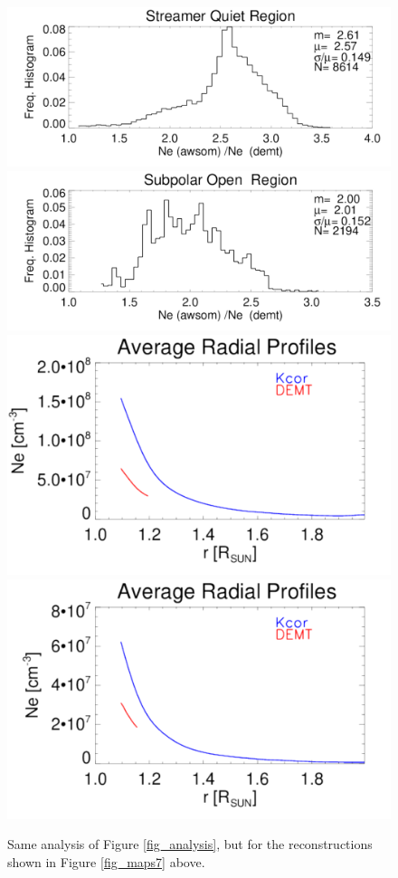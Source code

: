 \documentclass[baaa]{baaa}
\begin{document}
\begin{figure}[!h]
  \centering
  \includegraphics[width=\columnwidth]{comparison_KCOR-Tom_vs_DEMT_CR2208_h_l1069_reduced_kcor_6e5_newgrid-Quiet-region2_ratio_range1105-1195_Rsun.pdf}
  \includegraphics[width=\columnwidth]{comparison_KCOR-Tom_vs_DEMT_CR2208_h_l1069_reduced_kcor_6e5_newgrid-Open-region_N_ratio_range1105-1155_Rsun.pdf}\\
  \includegraphics[width=0.75\columnwidth]{Average_Radial_Profiles_KCOR-Tom_vs_DEMT_CR2208_h_l1069_reduced_kcor_6e5_newgrid-Quiet-region2.pdf}
  \hskip 2cm
  \includegraphics[width=0.75\columnwidth]{Average_Radial_Profiles_KCOR-Tom_vs_DEMT_CR2208_h_l1069_reduced_kcor_6e5_newgrid-Open-region_N.pdf}
  \caption{Same analysis of Figure \ref{fig_analysis}, but for the reconstructions shown in Figure \ref{fig_maps7} above.}
  \label{fig_analysis7}
\end{figure}
\end{document}
